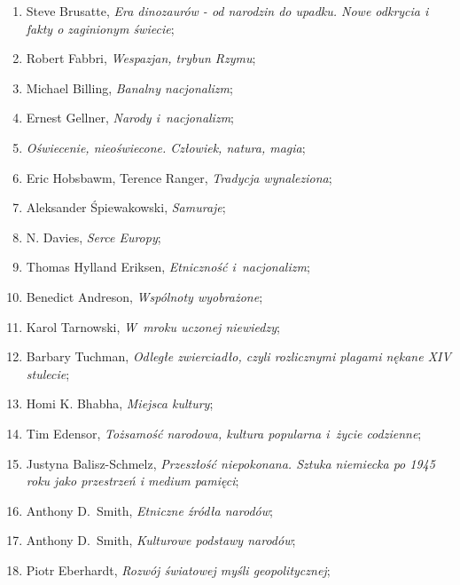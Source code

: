 \documentclass[a4paper,11pt]{article}
\begin{document}
\begin{enumerate}
\item Steve Brusatte, \textit{Era dinozaurów - od narodzin do upadku.
    Nowe odkrycia i fakty o zaginionym świecie};

\item Robert Fabbri, \textit{Wespazjan, trybun Rzymu};

\item Michael Billing, \textit{Banalny nacjonalizm};

\item Ernest Gellner, \textit{Narody i~nacjonalizm};

\item \textit{Oświecenie, nieoświecone. Człowiek, natura, magia};

\item Eric Hobsbawm, Terence Ranger, \textit{Tradycja wynaleziona};

\item Aleksander Śpiewakowski, \textit{Samuraje};

\item N. Davies, \textit{Serce Europy};

\item Thomas Hylland Eriksen, \textit{Etniczność i~nacjonalizm};

\item Benedict Andreson, \textit{Wspólnoty wyobrażone};

\item Karol Tarnowski, \textit{W~mroku uczonej niewiedzy};

\item Barbary Tuchman, \textit{Odległe zwierciadło, czyli rozlicznymi
    plagami nękane XIV stulecie};

\item Homi K. Bhabha, \textit{Miejsca kultury};

\item Tim Edensor, \textit{Tożsamość narodowa, kultura popularna i~życie
    codzienne};

\item Justyna Balisz-Schmelz, \textit{Przeszłość niepokonana. Sztuka
    niemiecka po 1945 roku jako przestrzeń i medium pamięci};

\item Anthony D.~Smith, \textit{Etniczne źródła narodów};

\item Anthony D.~Smith, \textit{Kulturowe podstawy narodów};

\item Piotr Eberhardt, \textit{Rozwój światowej myśli geopolitycznej};


\end{enumerate}
\end{document}

